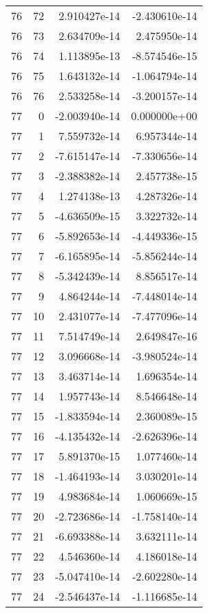 \begin{tabular}{rrrr}
  76 &   72 &  2.910427e-14 & -2.430610e-14 \\
  76 &   73 &  2.634709e-14 &  2.475950e-14 \\
  76 &   74 &  1.113895e-13 & -8.574546e-15 \\
  76 &   75 &  1.643132e-14 & -1.064794e-14 \\
  76 &   76 &  2.533258e-14 & -3.200157e-14 \\
  77 &    0 & -2.003940e-14 &  0.000000e+00 \\
  77 &    1 &  7.559732e-14 &  6.957344e-14 \\
  77 &    2 & -7.615147e-14 & -7.330656e-14 \\
  77 &    3 & -2.388382e-14 &  2.457738e-15 \\
  77 &    4 &  1.274138e-13 &  4.287326e-14 \\
  77 &    5 & -4.636509e-15 &  3.322732e-14 \\
  77 &    6 & -5.892653e-14 & -4.449336e-15 \\
  77 &    7 & -6.165895e-14 & -5.856244e-14 \\
  77 &    8 & -5.342439e-14 &  8.856517e-14 \\
  77 &    9 &  4.864244e-14 & -7.448014e-14 \\
  77 &   10 &  2.431077e-14 & -7.477096e-14 \\
  77 &   11 &  7.514749e-14 &  2.649847e-16 \\
  77 &   12 &  3.096668e-14 & -3.980524e-14 \\
  77 &   13 &  3.463714e-14 &  1.696354e-14 \\
  77 &   14 &  1.957743e-14 &  8.546648e-14 \\
  77 &   15 & -1.833594e-14 &  2.360089e-15 \\
  77 &   16 & -4.135432e-14 & -2.626396e-14 \\
  77 &   17 &  5.891370e-15 &  1.077460e-14 \\
  77 &   18 & -1.464193e-14 &  3.030201e-14 \\
  77 &   19 &  4.983684e-14 &  1.060669e-15 \\
  77 &   20 & -2.723686e-14 & -1.758140e-14 \\
  77 &   21 & -6.693388e-14 &  3.632111e-14 \\
  77 &   22 &  4.546360e-14 &  4.186018e-14 \\
  77 &   23 & -5.047410e-14 & -2.602280e-14 \\
  77 &   24 & -2.546437e-14 & -1.116685e-14 \\

\end{tabular}
